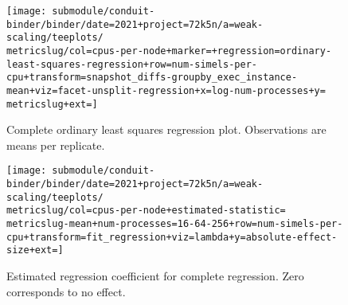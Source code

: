 \begin{figure*}
  \centering

  \begin{subfigure}[b]{0.5\textwidth}
    \centering
    \texttt{[image: submodule/conduit-binder/binder/date=2021+project=72k5n/a=weak-scaling/teeplots/\\metricslug/col=cpus-per-node+marker=+regression=ordinary-least-squares-regression+row=num-simels-per-cpu+transform=snapshot\_diffs-groupby\_exec\_instance-mean+viz=facet-unsplit-regression+x=log-num-processes+y=\\metricslug+ext=]}
    \caption{
      Complete ordinary least squares regression plot.
      Observations are means per replicate.
    }
    \label{fig:weak-scaling-regression-ols-\metricslug-complete-regression}
  \end{subfigure}%
  \begin{subfigure}[b]{0.5\textwidth}
    \centering
    \texttt{[image: submodule/conduit-binder/binder/date=2021+project=72k5n/a=weak-scaling/teeplots/\\metricslug/col=cpus-per-node+estimated-statistic=\\metricslug-mean+num-processes=16-64-256+row=num-simels-per-cpu+transform=fit\_regression+viz=lambda+y=absolute-effect-size+ext=]}
    \caption{Estimated regression coefficient for complete regression. Zero corresponds to no effect.}
    \label{fig:weak-scaling-regression-ols-\metricslug-complete-effect-size}
  \end{subfigure}


\end{figure*}
